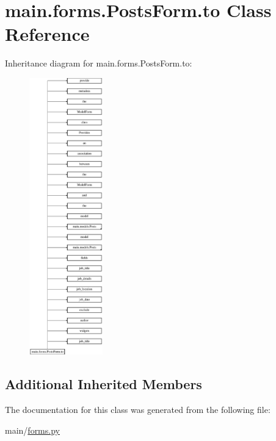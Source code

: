 \hypertarget{classmain_1_1forms_1_1PostsForm_1_1to}{}\section{main.\+forms.\+Posts\+Form.\+to Class Reference}
\label{classmain_1_1forms_1_1PostsForm_1_1to}
Inheritance diagram for main.\+forms.\+Posts\+Form.\+to\+:\begin{figure}[H]
\begin{center}
\leavevmode
\includegraphics[height=12.000000cm]{classmain_1_1forms_1_1PostsForm_1_1to}
\end{center}
\end{figure}
\subsection*{Additional Inherited Members}


The documentation for this class was generated from the following file\+:\begin{DoxyCompactItemize}
\item 
main/\hyperlink{forms_8py}{forms.\+py}\end{DoxyCompactItemize}
